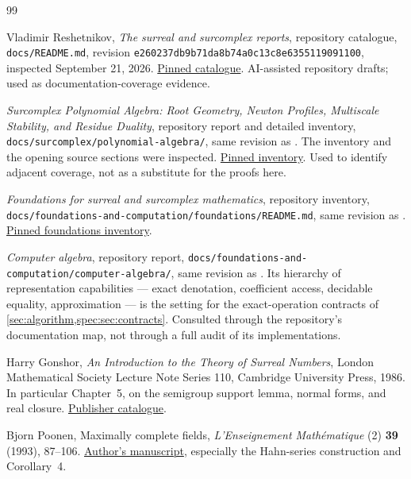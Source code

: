 \documentclass[11pt,a4paper]{article}
\numberwithin{equation}{section}
\theoremstyle{definition}
\theoremstyle{remark}
\newcommand{\repocommit}{e260237db9b71da8b74a0c13c8e6355119091100}
\begin{document}
\begin{thebibliography}{99}
\raggedright
{}

Vladimir Reshetnikov, \emph{The surreal and surcomplex reports}, repository
catalogue, \texttt{docs/README.md}, revision
\texttt{\repocommit}, inspected September 21, 2026.
\href{https://github.com/VladimirReshetnikov/Surreal/blob/e260237db9b71da8b74a0c13c8e6355119091100/docs/README.md}{Pinned catalogue}.
AI-assisted repository drafts; used as documentation-coverage evidence.

\emph{Surcomplex Polynomial Algebra: Root Geometry, Newton Profiles,
Multiscale Stability, and Residue Duality}, repository report and detailed
inventory, \texttt{docs/surcomplex/polynomial-algebra/}, same revision as
\cite{RepoMap}. The inventory and the opening source sections were inspected.
\href{https://github.com/VladimirReshetnikov/Surreal/blob/e260237db9b71da8b74a0c13c8e6355119091100/docs/surcomplex/polynomial-algebra/README.md}{Pinned inventory}.
Used to identify adjacent coverage, not as a substitute for the proofs here.

\emph{Foundations for surreal and surcomplex mathematics}, repository
inventory, \texttt{docs/foundations-and-computation/foundations/README.md},
same revision as \cite{RepoMap}.
\href{https://github.com/VladimirReshetnikov/Surreal/blob/e260237db9b71da8b74a0c13c8e6355119091100/docs/foundations-and-computation/foundations/README.md}{Pinned foundations inventory}.

\emph{Computer algebra}, repository report,
\texttt{docs/foundations-and-computation/computer-algebra/}, same revision
as \cite{RepoMap}. Its hierarchy of representation capabilities --- exact
denotation, coefficient access, decidable equality, approximation --- is the
setting for the exact-operation contracts of
\cref{sec:algorithm,spec:sec:contracts}. Consulted through the repository's
documentation map, not through a full audit of its implementations.

Harry Gonshor, \emph{An Introduction to the Theory of Surreal Numbers},
London Mathematical Society Lecture Note Series 110, Cambridge University
Press, 1986. In particular Chapter~5, on the semigroup support lemma,
normal forms, and real closure.
\href{https://www.cambridge.org/core/books/an-introduction-to-the-theory-of-surreal-numbers/312AE504A3E88E804054BFB390446374}{Publisher catalogue}.

Bjorn Poonen, Maximally complete fields, \emph{L'Enseignement
Math\'ematique} (2) \textbf{39} (1993), 87--106.
\href{https://math.mit.edu/~poonen/papers/amsval.pdf}{Author's manuscript},
especially the Hahn-series construction and Corollary~4.


\end{thebibliography}
\end{document}
